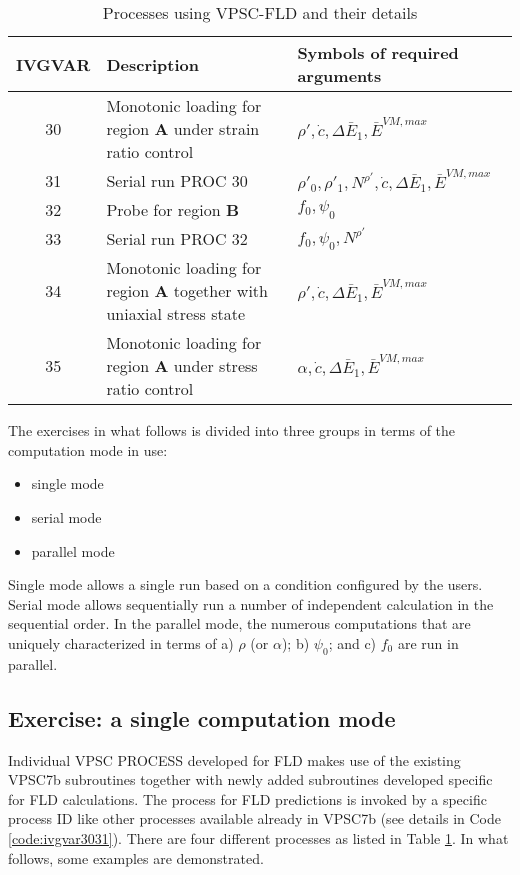 \documentclass[12pt]{amsart}
\begin{document}
\begin{table}[h]
  \caption{Processes using VPSC-FLD and their details}
  \label{tab:process}
  \begin{tabular}{c | l | l}
    IVGVAR     & Description                             & Symbols of required arguments \\
    \hline
    30         & Monotonic loading for region \textbf{A} under strain ratio control& $\rho', \dot{c}, \Delta{\bar{E}_1},\bar{E}^{VM, max}$ \\
    31         & Serial run PROC 30                      & $\rho'_0, \rho'_1, N^{\rho'}, \dot{c}, \Delta{\bar{E}_1}, \bar{E}^{VM, max}$ \\
    \hline
    32         & Probe for region \textbf{B}             & $f_0, \psi_0$ \\
    33         & Serial run PROC 32                      & $f_0, \psi_0, N^{\rho'}$\\
    \hline
    34         & Monotonic loading for region \textbf{A} together with uniaxial stress state& $\rho', \dot{c}, \Delta{\bar{E}_1},\bar{E}^{VM, max}$ \\
    35         & Monotonic loading for region \textbf{A} under stress ratio control  & $\alpha, \dot{c}, \Delta{\bar{E}_1},\bar{E}^{VM, max}$ \\
  \end{tabular}
\end{table}
\newline
The exercises in what follows is divided into three groups in terms of the computation mode in use:
\begin{itemize}
\item single mode
\item serial mode
\item parallel mode
\end{itemize}
Single mode allows a single run based on a condition configured by the users.
Serial mode allows sequentially run a number of independent calculation in the sequential order.
In the parallel mode, the numerous computations that are uniquely characterized in terms of a) $\rho$ (or $\alpha$); b) $\psi_0$; and c) $f_0$ are run in parallel.
\newpage
\subsection{Exercise: a single computation mode}
\label{sec:ex_single_run}
Individual VPSC PROCESS developed for FLD makes use of the existing VPSC7b subroutines together with newly added subroutines developed specific for FLD calculations.
The process for FLD predictions is invoked by a specific process ID like other processes available already in VPSC7b (see details in Code \ref{code:ivgvar3031}).
There are four different processes as listed in Table \ref{tab:process}.
In what follows, some examples are demonstrated.
\end{document}

